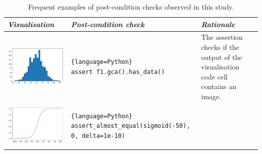 \documentclass[conference]{IEEEtran}
\begin{document}
\begin{table}
\centering
\caption{Frequent examples of post-condition checks observed in this study.}
  \begin{tabular}{m{} m{} m{}}
\hline
\emph{\textbf{Visualisation}}&
\emph{\textbf{Post-condition check}}&
\emph{\textbf{Rationale}}\\
\hline
\includegraphics[width=\linewidth]{post-cond-01.png}&
\begin{lstlisting}{language=Python}
assert f1.gca().has_data()
\end{lstlisting}&
The assertion checks if the output of the visualisation code cell contains an image.\\
\includegraphics[width=\linewidth]{post-cond-02.png}&
\begin{lstlisting}{language=Python}
assert_almost_equal(sigmoid(-50), 0, delta=1e-10)

\end{lstlisting}
\end{tabular}
\end{table}
\end{document}
